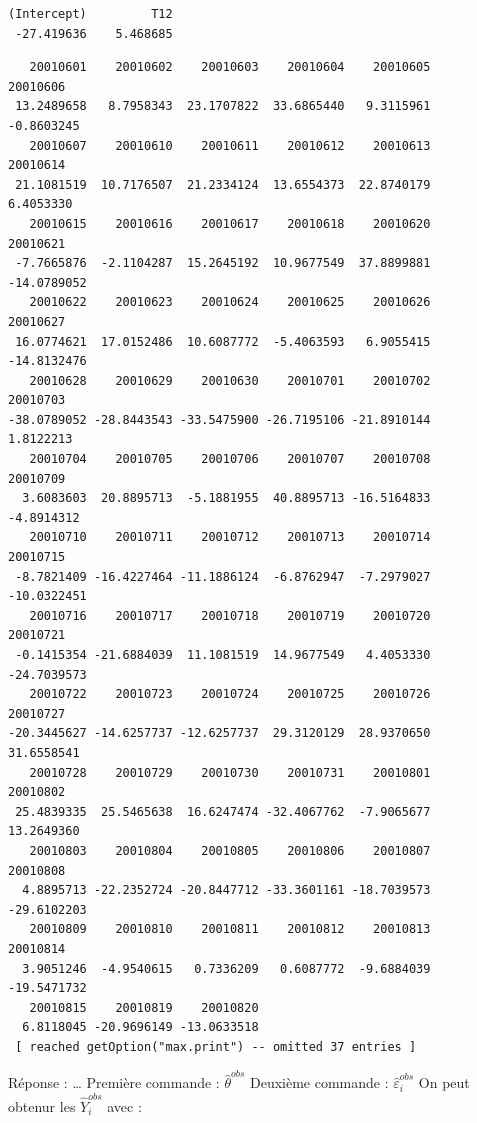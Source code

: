 \documentclass[
]{article}
\newenvironment{Shaded}{\begin{snugshade}}{\end{snugshade}}
\newcommand{\NormalTok}[1]{#1}
\newcommand{\SpecialCharTok}[1]{\textcolor[rgb]{0.81,0.36,0.00}{\textbf{#1}}}
\begin{document}
\begin{verbatim}
(Intercept)         T12 
 -27.419636    5.468685 
\end{verbatim}

\begin{Shaded}
\end{Shaded}

\begin{verbatim}
   20010601    20010602    20010603    20010604    20010605    20010606 
 13.2489658   8.7958343  23.1707822  33.6865440   9.3115961  -0.8603245 
   20010607    20010610    20010611    20010612    20010613    20010614 
 21.1081519  10.7176507  21.2334124  13.6554373  22.8740179   6.4053330 
   20010615    20010616    20010617    20010618    20010620    20010621 
 -7.7665876  -2.1104287  15.2645192  10.9677549  37.8899881 -14.0789052 
   20010622    20010623    20010624    20010625    20010626    20010627 
 16.0774621  17.0152486  10.6087772  -5.4063593   6.9055415 -14.8132476 
   20010628    20010629    20010630    20010701    20010702    20010703 
-38.0789052 -28.8443543 -33.5475900 -26.7195106 -21.8910144   1.8122213 
   20010704    20010705    20010706    20010707    20010708    20010709 
  3.6083603  20.8895713  -5.1881955  40.8895713 -16.5164833  -4.8914312 
   20010710    20010711    20010712    20010713    20010714    20010715 
 -8.7821409 -16.4227464 -11.1886124  -6.8762947  -7.2979027 -10.0322451 
   20010716    20010717    20010718    20010719    20010720    20010721 
 -0.1415354 -21.6884039  11.1081519  14.9677549   4.4053330 -24.7039573 
   20010722    20010723    20010724    20010725    20010726    20010727 
-20.3445627 -14.6257737 -12.6257737  29.3120129  28.9370650  31.6558541 
   20010728    20010729    20010730    20010731    20010801    20010802 
 25.4839335  25.5465638  16.6247474 -32.4067762  -7.9065677  13.2649360 
   20010803    20010804    20010805    20010806    20010807    20010808 
  4.8895713 -22.2352724 -20.8447712 -33.3601161 -18.7039573 -29.6102203 
   20010809    20010810    20010811    20010812    20010813    20010814 
  3.9051246  -4.9540615   0.7336209   0.6087772  -9.6884039 -19.5471732 
   20010815    20010819    20010820 
  6.8118045 -20.9696149 -13.0633518 
 [ reached getOption("max.print") -- omitted 37 entries ]
\end{verbatim}

Réponse : \ldots{} Première commande : \(\hat{\theta}^{obs}\) Deuxième
commande : \(\hat{\varepsilon}_{i}^{obs}\) On peut obtenur les
\(\hat{Y}_{i}^{obs}\) avec :
\end{document}
